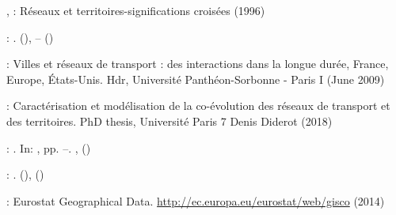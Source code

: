 \documentclass{article}
\begin{document}
\begin{thebibliography}{59}
\begin{botherref}
,
:
R{\'e}seaux et territoires-significations crois{\'e}es
(1996)
\end{botherref}
\endbibitem

\begin{barticle}
:
.
(),
--
()
\end{barticle}
\endbibitem

\begin{botherref}
:
{Villes et r{\'e}seaux de transport : des interactions dans la longue
  dur{\'e}e, France, Europe, {\'E}tats-Unis}.
Hdr,
Universit{\'e} Panth{\'e}on-Sorbonne - Paris I
(June 2009)
\end{botherref}
\endbibitem

\begin{botherref}
:
Caract{\'e}risation et mod{\'e}lisation de la co-{\'e}volution des r{\'e}seaux
  de transport et des territoires.
PhD thesis,
Universit{\'e} Paris 7 Denis Diderot
(2018)
\end{botherref}
\endbibitem

\begin{bchapter}
:
.
In: ,
pp. --.
,
()
\end{bchapter}
\endbibitem

\begin{barticle}
:
.
(),
()
\end{barticle}
\endbibitem

\begin{botherref}
:
Eurostat Geographical Data.
\url{http://ec.europa.eu/eurostat/web/gisco}
(2014)
\end{botherref}
\endbibitem


\end{thebibliography}
\end{document}
